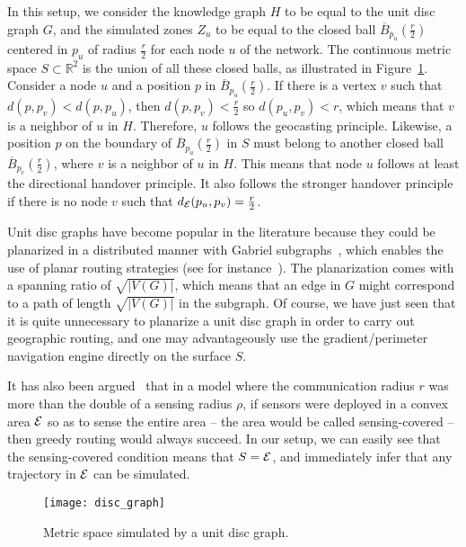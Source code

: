 \documentclass{article}
\newcommand{\englobing}{{\cal E}}
\begin{document}
In this setup, we consider the knowledge graph $H$ to be equal to the unit disc graph $G$, and the simulated zones $Z_u$ to be equal to the closed ball
 $\overline{B}_{p_u}(\frac{r}{2})$ centered in $p_u$ of radius $\frac{r}{2}$ for each node $u$ of the network. The continuous metric space $S\subset\mathbb{R}^2$ is the union of all these closed balls, as illustrated in Figure~\ref{fig_disc_graph}.
Consider a node $u$ and a position $p$ in $\overline{B}_{p_u}(\frac{r}{2})$. If there is a vertex $v$ such that $d(p,p_v) < d(p,p_u)$, then $d(p,p_v) < \frac{r}{2}$ so $d(p_u,p_v) < r$, which means that $v$ is a neighbor of $u$ in $H$. Therefore, $u$ follows the geocasting principle. Likewise, a position $p$ on the boundary of $\overline{B}_{p_u}(\frac{r}{2})$ in $S$ must belong to another closed ball $\overline{B}_{p_v}(\frac{r}{2})$, where $v$ is a neighbor of $u$ in $H$. This means that node $u$ follows at least the directional handover principle. It also follows the stronger handover principle if there is no node $v$ such that $d_\englobing(p_u,p_v)=\frac{r}{2}$.

Unit disc graphs have become popular in the literature because they could be planarized in a distributed manner with Gabriel subgraphs~\cite{bib_gabriel}, which enables the use of planar routing strategies (see for instance~\cite{bib_gfg,bib_gpsr}). The planarization comes with a spanning ratio of $\sqrt{|V(G)|}$, which means that an edge in $G$ might correspond to a path of length $\sqrt{|V(G)|}$ in the subgraph. Of course, we have just seen that it is quite unnecessary to planarize a unit disc graph in order to carry out geographic routing, and one may advantageously use the gradient/perimeter navigation engine directly on the surface $S$.

It has also been argued~\cite{bib_sensing} that in a model where the communication radius $r$ was more than the double of a sensing radius $\rho$, if sensors were deployed in a convex area $\englobing$ so as to sense the entire area -- the area would be called sensing-covered -- then greedy routing would always succeed. In our setup, we can easily see that the sensing-covered condition means that $S = \englobing$, and immediately infer that any trajectory in $\englobing$ can be simulated.

\begin{figure}[h]
\begin{center}
\texttt{[image: disc\_graph]}
\caption{Metric space simulated by a unit disc graph.}
\label{fig_disc_graph}
\end{center}
\end{figure}
\end{document}
